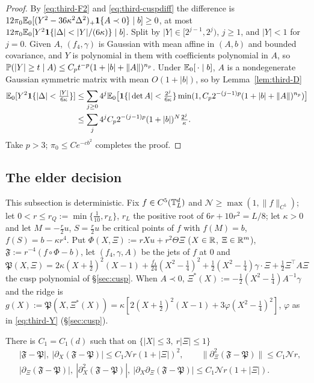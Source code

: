 \begin{proof}
By \eqref{eq:third-F2} and \eqref{eq:third-cuspdiff} the difference is $12\pi_0\mathbb E_0[(Y^2-36\kappa^2\Delta^2)_+\mathbf 1\{A\prec0\}\mid b]\ge0$, at most $12\pi_0\E_0[Y^2\ind\{|\Delta|<|Y|/(6\kappa)\}\mid b]$. Split by $|Y|\in[2^{j-1},2^j)$, $j\ge1$, and $|Y|<1$ for $j=0$. Given $A$, $(f_4,\gamma)$ is Gaussian with mean affine in $(A,b)$ and bounded covariance, and $Y$ is polynomial in them with coefficients polynomial in $A$, so $\mathbb P(|Y|\ge t\mid A)\le C_pt^{-p}(1+|b|+\|A\|)^{n_p}$. Under $\mathbb E_0[\,\cdot\mid b]$, $A$ is a nondegenerate Gaussian symmetric matrix with mean $O(1+|b|)$, so by Lemma~\ref{lem:third-D}
\[
\begin{aligned}
\mathbb E_0[Y^2\mathbf 1\{|\Delta|<\tfrac{|Y|}{6\kappa}\}]&\le\sum_{j\ge0}4^j\mathbb E_0\bigl[\mathbf 1\{|\det A|<\tfrac{2^j}{6\kappa}\}\min(1,C_p2^{-(j-1)p}(1+|b|+\|A\|)^{n_p})\bigr]\\
&\le\sum_j4^jC_p2^{-(j-1)p}(1+|b|)^N\tfrac{2^j}\kappa.
\end{aligned}
\]
Take $p>3$; $\pi_0\le Ce^{-cb^2}$ completes the proof.
\end{proof}

\subsection{The elder decision}\label{ssec:third-decision}

This subsection is deterministic. Fix $f\in C^5(\mathbb T^d_L)$ and $\mathcal N\ge\max(1,\|f\|_{C^5})$; let $0<r\le r_Q:=\min\{\frac1{10},r_L\}$, $r_L$ the positive root of $6r+10r^2=L/8$; let $\kappa>0$ and let $M=-\frac r2u$, $S=\frac r2u$ be critical points of $f$ with $f(M)=b$, $f(S)=b-\kappa r^4$. Put $\Phi(X,\Xi):=rXu+r^2\Theta\Xi$ ($X\in\mathbb R$, $\Xi\in\mathbb R^m$), $\mathfrak F:=r^{-4}(f\circ\Phi-b)$, let $(f_4,\gamma,A)$ be the jets of $f$ at $0$ and
\begin{equation}\label{eq:third-cuspP}
\mathfrak P(X,\Xi)=2\kappa(X+\tfrac12)^2(X-1)+\tfrac{f_4}{24}(X^2-\tfrac14)^2+\tfrac12(X^2-\tfrac14)\gamma\cdot\Xi+\tfrac12\Xi^\top A\Xi
\end{equation}
the cusp polynomial of \S\ref{sec:cusp}. When $A\prec0$, $\Xi^*(X):=-\frac12(X^2-\frac14)A^{-1}\gamma$ and the ridge is $g(X):=\mathfrak P(X,\Xi^*(X))=\kappa[2(X+\frac12)^2(X-1)+3\varphi(X^2-\frac14)^2]$, $\varphi$ as in \eqref{eq:third-Y} (\S\ref{sec:cusp}).

\begin{lemma}\label{lem:third-CU1}
There is $C_1=C_1(d)$ such that on $\{|X|\le3,\ r|\Xi|\le1\}$
\begin{equation}\label{eq:third-CU1}
\begin{aligned}
&|\mathfrak F-\mathfrak P|,\ |\partial_X(\mathfrak F-\mathfrak P)|\le C_1\mathcal Nr(1+|\Xi|)^2,\qquad \|\partial_\Xi^2(\mathfrak F-\mathfrak P)\|\le C_1\mathcal Nr,\\
&|\partial_\Xi(\mathfrak F-\mathfrak P)|,\ |\partial_X^2(\mathfrak F-\mathfrak P)|,\ |\partial_X\partial_\Xi(\mathfrak F-\mathfrak P)|\le C_1\mathcal Nr(1+|\Xi|).
\end{aligned}
\end{equation}
\end{lemma}

